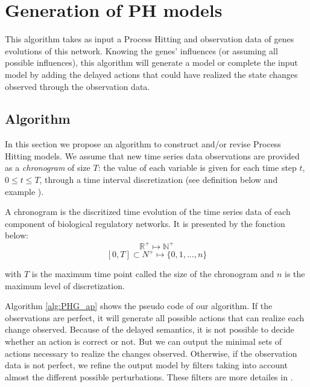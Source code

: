 
\section{Generation of PH models}
\label{sec:ph-generation}

This algorithm takes as input a Process Hitting and observation data of genes evolutions of this network.
Knowing the genes' influences (or assuming all possible influences),
this algorithm will generate a model or complete the input model by adding the delayed actions that could have realized the state changes observed through the observation data.

\subsection{Algorithm}
In this section we propose an algorithm to construct and/or revise Process Hitting models.
We assume that new time series data observations are provided as a {\it chronogram} of size $T$:
the value of each variable is given for each time step $t$, $0 \leq t \leq T$, through a time interval discretization (see definition below and example ).   

\begin{definition}[Chronogram]
A chronogram is the discritized time evolution of the time series data of each component of biological regulatory networks. It is presented by the fonction below: \\

$$\mathds{R}^+ \longmapsto \mathds{N}^+$$
$$ [0,T] \subset {N}^+ \longmapsto \{0,1,..., n\}$$

with $T$ is the maximum time point called the size of the chronogram and $n$ is the maximum level of discretization.
\end{definition}

Algorithm \ref{alg:PHG_ap} shows the pseudo code of our algorithm.
If the observations are perfect, it will generate all possible actions that can realize each change observed.
Because of the delayed semantics, it is not possible to decide whether an action is correct or not.
But we can output the minimal sets of actions necessary to realize the changes observed.
Otherwise, if the observation data is not perfect, we refine the output model by filters taking into account almost the different possible perturbations. These filters are more detailes in .



